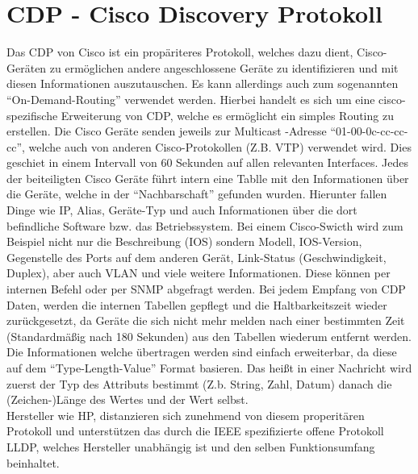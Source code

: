 \section{CDP - Cisco Discovery Protokoll}
\label{sec:cdp}

Das CDP von Cisco ist ein propäriteres Protokoll, welches dazu dient, Cisco-Geräten zu ermöglichen andere angeschlossene Geräte zu identifizieren und mit diesen Informationen auszutauschen. Es kann allerdings auch zum sogenannten “On-Demand-Routing” verwendet werden. Hierbei handelt es sich um eine cisco-spezifische Erweiterung von CDP, welche es ermöglicht ein simples Routing zu erstellen.
Die Cisco Geräte senden jeweils zur Multicast -Adresse “01-00-0c-cc-cc-cc”, welche auch von anderen Cisco-Protokollen (Z.B. VTP) verwendet wird. Dies geschiet in einem Intervall von 60 Sekunden auf allen relevanten Interfaces. Jedes der beiteiligten Cisco Geräte führt intern eine Tablle mit den Informationen über die Geräte, welche in der “Nachbarschaft” gefunden wurden. Hierunter fallen Dinge wie IP, Alias, Geräte-Typ und auch Informationen über die dort befindliche Software bzw. das Betriebssystem. Bei einem Cisco-Swicth wird zum Beispiel nicht nur die Beschreibung (IOS) sondern Modell, IOS-Version, Gegenstelle des Ports auf dem anderen Gerät, Link-Status (Geschwindigkeit, Duplex), aber auch VLAN und viele weitere Informationen. Diese können per internen Befehl oder per SNMP abgefragt werden. Bei jedem Empfang von CDP Daten, werden die internen Tabellen gepflegt und die Haltbarkeitszeit wieder zurückgesetzt, da Geräte die sich nicht mehr melden nach einer bestimmten Zeit (Standardmäßig nach 180 Sekunden) aus den Tabellen wiederum entfernt werden. Die Informationen welche übertragen werden sind einfach erweiterbar, da diese auf dem “Type-Length-Value” Format basieren. Das heißt in einer Nachricht wird zuerst der Typ des Attributs bestimmt (Z.b. String, Zahl, Datum) danach die (Zeichen-)Länge des Wertes und der Wert selbst.\\
Hersteller wie HP, distanzieren sich zunehmend von diesem properitären Protokoll und unterstützen das durch die IEEE spezifizierte offene Protokoll LLDP, welches Hersteller unabhängig ist und den selben Funktionsumfang beinhaltet.